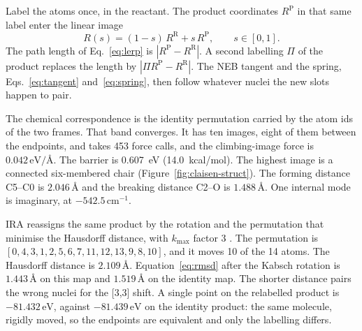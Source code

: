 Label the atoms once, in the reactant.
The product coordinates \(R^{\mathrm{P}}\) in that same label enter the linear image
\begin{equation}
\label{eq:lerp}
R(s)=(1-s)\,R^{\mathrm{R}}+s\,R^{\mathrm{P}},\qquad s\in[0,1].
\end{equation}
The path length of Eq.~\eqref{eq:lerp} is \(|R^{\mathrm{P}}-R^{\mathrm{R}}|\).
A second labelling \(\Pi\) of the product replaces the length by \(|\Pi R^{\mathrm{P}}-R^{\mathrm{R}}|\).
The NEB tangent and the spring, Eqs.~\eqref{eq:tangent} and~\eqref{eq:spring}, then follow whatever nuclei the new slots happen to pair.

The chemical correspondence is the identity permutation carried by the atom ids of the two frames.
That band converges.
It has ten images, eight of them between the endpoints, and takes 453 force calls, and the climbing-image force is \(0.042\,\mathrm{eV/\text{\AA}}\).
The barrier is 0.607~eV (14.0~kcal/mol).
The highest image is a connected six-membered chair (Figure~\ref{fig:claisen-struct}).
The forming distance C5--C0 is \(2.046\,\text{\AA}\) and the breaking distance C2--O is \(1.488\,\text{\AA}\).
One internal mode is imaginary, at \(-542.5\,\mathrm{cm}^{-1}\).

IRA reassigns the same product by the rotation and the permutation that minimise the Hausdorff distance, with \(k_{\max}\) factor 3
\cite{gundeIRAShapeMatching2021}.
The permutation is \([0,4,3,1,2,5,6,7,11,12,13,9,8,10]\), and it moves 10 of the 14 atoms.
The Hausdorff distance is \(2.109\,\text{\AA}\).
Equation~\eqref{eq:rmsd} after the Kabsch rotation is \(1.443\,\text{\AA}\) on this map and \(1.519\,\text{\AA}\) on the identity map.
The shorter distance pairs the wrong nuclei for the [3,3] shift.
A single point on the relabelled product is \(-81.432\,\mathrm{eV}\), against \(-81.439\,\mathrm{eV}\) on the identity product: the same molecule, rigidly moved, so the endpoints are equivalent and only the labelling differs.

